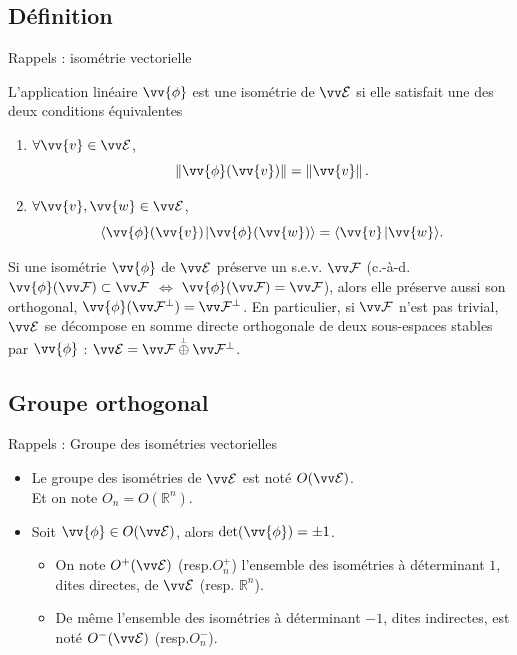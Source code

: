 \documentclass[bigger]{m53beamer}
\begin{document}
\subsection{Définition}
\begin{frame}{Rappels : isométrie vectorielle }
  \begin{defprop}
    L'application linéaire $\vv{\phi}$ est une \alert{isométrie} de $\ev{E}$ si elle satisfait une des deux conditions équivalentes
    \begin{enumerate}[<+(1)->]
      \item $\forall \vv{v} \in \ev{E}$,
        \[
           \norm{\vv{\phi}(\vv{v})}=\norm{\vv{v}}.
        \]
      \item $\forall \vv{v},\vv{w} \in \ev{E}$,
        \[
          \scalprod{\vv{\phi}(\vv{v})}{\vv{\phi}(\vv{w})}=\scalprod{\vv{v}}{\vv{w}}.
        \]\forsimple{\vspace*{-.7\baselineskip}}
    \end{enumerate}
  \end{defprop}\pause
  Si une isométrie $\vv{\phi}$ de $\ev{E}$ préserve un s.e.v. $\ev{F}$ \pause(c.-à-d. $\vv{\phi}(\ev{F})\subset\ev{F}$ $\Leftrightarrow$ $\vv{\phi}(\ev{F})=\ev{F}$)\pause, alors elle préserve aussi son orthogonal\pause, $\vv{\phi}(\ev{F}^{\perp})=\ev{F}^{\perp}$. \pause
  En particulier, si $\ev{F}$ n'est pas trivial, $\ev{E}$ se décompose en somme directe orthogonale de deux sous-espaces stables par $\vv{\phi}$ : $\ev{E}=\ev{F}\poplus\ev{F}^{\perp}$.
\end{frame}

\subsection{Groupe orthogonal}
\begin{frame}{Rappels : Groupe des isométries vectorielles}
  \begin{itemize}[<+(1)->]
    \item Le \alert{groupe des isométries} de $\ev{E}$ est noté $O(\ev{E})$.\\
      Et on note $O_{n} = O(\mathbb{R}^{n})$.
    \item Soit $\vv{\phi} \in O(\ev{E})$, alors $\det(\vv{\phi}) = \pm 1$.\pause\\
      \begin{itemize}[<+(1)->]
        \item On note $O^{+}(\ev{E})$ (resp.$O_{n}^{+}$) l'ensemble des isométries à déterminant $1$, dites \alert{directes}, de $\ev{E}$ (resp. $\mathbb{R}^{n}$).
        \item De même l'ensemble des isométries à déterminant $-1$, dites \alert{indirectes}, est noté $O^{-}(\ev{E})$ (resp.$O_{n}^{-}$).
      \end{itemize}\pause
  \end{itemize}
\end{frame}
\end{document}
